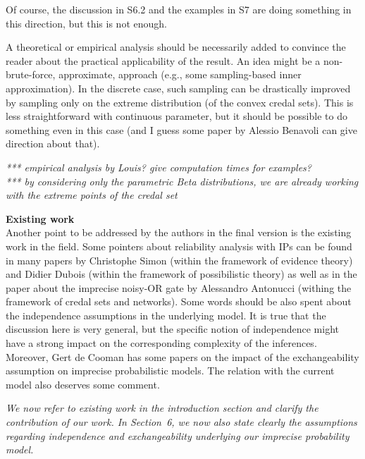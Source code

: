 \documentclass[12pt, a4paper]{elsarticle}
\begin{document}
Of course, the discussion in S6.2 and the examples in S7 are doing something in this direction, but this is not enough.

A theoretical or empirical analysis should be necessarily added to convince the reader about the practical applicability of the result.
An idea might be a non-brute-force, approximate, approach (e.g., some sampling-based inner approximation). In the discrete case, such sampling can be drastically improved by sampling only on the extreme distribution (of the convex credal sets). This is less straightforward with continuous parameter, but it should be possible to do something even in this case (and I guess some paper by Alessio Benavoli can give direction about that).

\medskip
\emph{*** empirical analysis by Louis? give computation times for examples?\\
*** by considering only the parametric Beta distributions, we are already working with the extreme points of the credal set}
%
\medskip

\textbf{Existing work}\\
Another point to be addressed by the authors in the final version is the existing work in the field. Some pointers about reliability analysis with IPs can be found in many papers by Christophe Simon (within the framework of evidence theory) and Didier Dubois (within the framework of possibilistic theory) as well as in the paper about the imprecise noisy-OR gate by Alessandro Antonucci (withing the framework of credal sets and networks). Some words should be also spent about the independence assumptions in the underlying model. It is true that the discussion here is very general, but the specific notion of independence might have a strong impact on the corresponding complexity of the inferences. Moreover, Gert de Cooman has some papers on the impact of the exchangeability assumption on imprecise probabilistic models. The relation with the current model also deserves some comment.

\medskip
\emph{We now refer to existing work in the introduction section and clarify the contribution of our work.
In Section~6, we now also state clearly the assumptions regarding independence and exchangeability
underlying our imprecise probability model.}
\medskip
\end{document}
